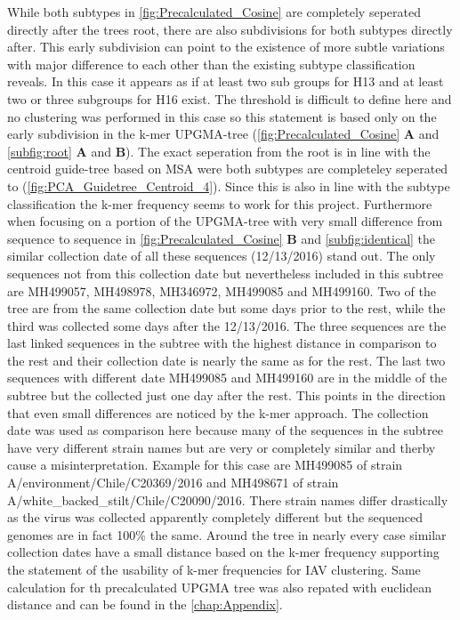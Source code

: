 While both subtypes in \autoref{fig:Precalculated_Cosine} are completely seperated directly after the trees root, there are also subdivisions for both subtypes directly after. This early subdivision can point to the existence of more subtle variations with major difference to each other than the existing subtype classification reveals. In this case it appears as if at least two sub groups for H13 and at least two or three subgroups for H16 exist. The threshold is difficult to define here and no clustering was performed in this case so this statement is based only on the early subdivision in the k-mer \gls{UPGMA}-tree (\autoref{fig:Precalculated_Cosine} \textbf{\textsf{A}} and \autoref{subfig:root} \textbf{\textsf{A}} and \textbf{\textsf{B}}). The exact seperation from the root is in line with the centroid guide-tree based on \gls{MSA} were both subtypes are completeley seperated to (\autoref{fig:PCA_Guidetree_Centroid_4}). Since this is also in line with the subtype classification the k-mer frequency seems to work for this project. Furthermore when focusing on a portion of the \gls{UPGMA}-tree with very small difference from sequence to sequence in \autoref{fig:Precalculated_Cosine} \textbf{\textsf{B}} and \autoref{subfig:identical} the similar collection date of all these sequences (12/13/2016) stand out. The only sequences not from this collection date but nevertheless included in this subtree are MH499057, MH498978, MH346972, MH499085 and MH499160. Two of the tree are from the same collection date but some days prior to the rest, while the third was collected some days after the 12/13/2016. The three sequences are the last linked sequences in the subtree with the highest distance in comparison to the rest and their collection date is nearly the same as for the rest. The last two sequences with different date MH499085 and MH499160 are in the middle of the subtree but the collected just one day after the rest. This points in the direction that even small differences are noticed by the k-mer approach. The collection date was used as comparison here because many of the sequences in the subtree have very different strain names but are very or completely similar and therby cause a misinterpretation. Example for this case are MH499085 of strain A/environment/Chile/C20369/2016 and MH498671 of strain A/white\_backed\_stilt/Chile/C20090/2016. There strain names differ drastically as the virus was collected apparently completely different but the sequenced genomes are in fact 100\% the same. Around the tree in nearly every case similar collection dates have a small distance based on the k-mer frequency supporting the statement of the usability of k-mer frequencies for \gls{IAV} clustering. Same calculation for th precalculated \gls{UPGMA} tree was also repated with euclidean distance and can be found in the \autoref{chap:Appendix}.

